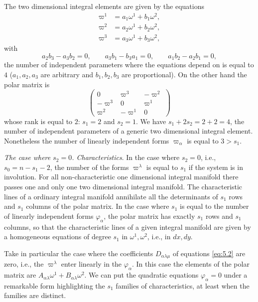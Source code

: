 The two dimensional integral elements are given by the equations
\begin{align*}
  \varpi^{1}&=a_{1}\omega^{1}+b_{1}\omega^{2},\\
  \varpi^{2}&=a_{2}\omega^{1}+b_{2}\omega^{2},\\
  \varpi^{3}&=a_{3}\omega^{1}+b_{3}\omega^{2},
\end{align*}
with
\[
a_{2}b_{3}-a_{3}b_{2}=0,\qquad a_{3}b_{1}-b_{3}a_{1}=0,\qquad a_{1}b_{2}-a_{2}b_{1}=0,
\]
the number of independent parameters where the equations depend on is equal to $4$ ($a_{1},a_{2},a_{3}$ are arbitrary and $b_{1},b_{2},b_{3}$ are proportional). On the other hand the polar matrix is
\[
\begin{pmatrix}
  0&\varpi^{3}&-\varpi^{2}\\
  -\varpi^{3}&0&\varpi^{1}\\
  \varpi^{2}&-\varpi^{1}&0
\end{pmatrix}
\]
whose rank is equal to $2$: $s_{1}=2$ and $s_{2}=1$. We have $s_{1}+2s_{2}=2+2=4$, the number of independent parameters of a generic two dimensional integral element. Nonetheless the number of linearly independent forms $\varpi_{\alpha}$ is equal to $3>s_{1}$.

\vspace{12pt}\fsec \emph{The case where $s_{2}=0$. Characteristics}. In the case where $s_{2}=0$, i.e., $s_{0}=n-s_{1}-2$, the number of the forms $\varpi^{\lambda}$ is equal to $s_{1}$ if the system is in involution. For all non-characteristic one dimensional integral manifold there passes one and only one two dimensional integral manifold. The characteristic lines of a ordinary integral manifold annihilate all the determinants of $s_{1}$ rows and $s_{1}$ columns of the polar matrix. In the case where $s_{1}$ is equal to the number of linearly independent forms $\varphi_{\alpha}$, the polar matrix has exactly $s_{1}$ rows and $s_{1}$ columns, so that the characteristic lines of a given integral manifold are given by a homogeneous equations of degree $s_{1}$ in $\omega^{1},\omega^{2}$, i.e., in $dx,dy$.

Take in particular the case where the coefficients $D_{\alpha\lambda\mu}$ of equations \eqref{eq:5.2} are zero, i.e., the $\varpi^{\lambda}$ enter linearly in the $\varphi_{\alpha}$. In this case the elements of the polar matrix are $A_{\alpha\lambda}\omega^{1}+B_{\alpha\lambda}\omega^{2}$. We can put the quadratic equations $\varphi_{\alpha}=0$ under a remarkable form highlighting the $s_{1}$ families of characteristics, at least when the families are distinct.

